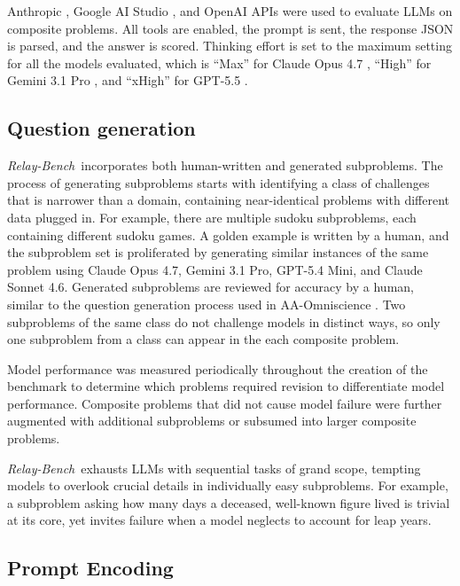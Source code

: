 \documentclass[10pt,letterpaper,twocolumn]{article}
\newcommand{\relaybench}{\texorpdfstring{{\textit{Relay-Bench}}}{Relay-Bench}}
\begin{document}
Anthropic \cite{anthropic-api}, Google AI Studio \cite{google-ai-studio-api}, and OpenAI APIs \cite{openai-api} were used to evaluate LLMs on composite problems. All tools are enabled, the prompt is sent, the response JSON is parsed, and the answer is scored. Thinking effort is set to the maximum setting for all the models evaluated, which is ``Max'' for Claude Opus 4.7 \cite{anthropic-adaptive-thinking}, ``High'' for Gemini 3.1 Pro \cite{gemini-thinking}, and ``xHigh'' for GPT-5.5 \cite{openai-reasoning}.

\subsection{Question generation}

\noindent \relaybench\ incorporates both human-written and generated subproblems. The process of generating subproblems starts with identifying a class of challenges that is narrower than a domain, containing near-identical problems with different data plugged in. For example, there are multiple sudoku subproblems, each containing different sudoku games. A golden example is written by a human, and the subproblem set is proliferated by generating similar instances of the same problem using Claude Opus 4.7, Gemini 3.1 Pro, GPT-5.4 Mini, and Claude Sonnet 4.6. Generated subproblems are reviewed for accuracy by a human, similar to the question generation process used in AA-Omniscience \cite{aa-omniscience-paper}. Two subproblems of the same class do not challenge models in distinct ways, so only one subproblem from a class can appear in the each composite problem.

Model performance was measured periodically throughout the creation of the benchmark to determine which problems required revision to differentiate model performance. Composite problems that did not cause model failure were further augmented with additional subproblems or subsumed into larger composite problems.

\relaybench\ exhausts LLMs with sequential tasks of grand scope, tempting models to overlook crucial details in individually easy subproblems. For example, a subproblem asking how many days a deceased, well-known figure lived is trivial at its core, yet invites failure when a model neglects to account for leap years.
\subsection{Prompt Encoding}
\label{sec:prompt-encoding}
\end{document}

